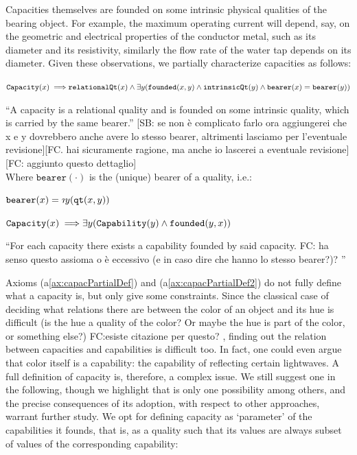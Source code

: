 \documentclass[sw]{iosart2x}
\newcommand{\bflist}{\begin{list}{}{\setlength{\topsep}{2mm}\setlength{\partopsep}{0mm}\setlength{\parsep}{0mm}\setlength{\leftmargin}{9mm}\setlength{\labelwidth}{8mm}}}
\newcommand{\eflist}{\end{list}}
\newcommand{\AxLabel}{\textrm{a}}
\newcommand{\DefLabel}{\textrm{d}}
\newcounter{cntax}
\newcommand{\myax}[1]{\refstepcounter{cntax}\begin{small}{\bf \AxLabel\thecntax\label{ax:#1}}\end{small}}
\newcounter{cntdef}
\newcommand{\mydf}[1]{\refstepcounter{cntdef}\begin{small}{\bf \DefLabel\thecntdef\label{def:#1}}\end{small}}
\newcommand{\mytext}[1]{``#1''}
\newcommand{\refax}[1]{({\AxLabel}\ref{#1})}
\newcommand{\generalStyle}[1]{\texttt{#1}}
\newcommand{\biRel}[3]{\generalStyle{#1}(#2,#3)}
\newcommand{\uniRel}[2]{\generalStyle{#1}(#2)}
\newcommand{\myfi}{\hspace{0.9mm} \Longrightarrow}
\newcommand{\suchthat}{\rotatebox[origin=c]{180}{$\iota$}}
\newcommand{\DOLCEQualityDirect}[2]{\biRel{qt}{#1}{#2}}
\newcommand{\bearer}[1]{\uniRel{bearer}{#1}}
\newcommand{\Capability}[1]{\uniRel{Capability}{#1}}
\newcommand{\Capacity}[1]{\uniRel{Capacity}{#1}}
\newcommand{\RelationalQuality}[1]{\uniRel{relationalQt}{#1}}
\newcommand{\IntrinsicQuality}[1]{\uniRel{intrinsicQt}{#1}}
\newcommand{\founded}[2]{\biRel{\foundedTerm{passive}}{#1}{#2}}
\newcommand{\foundedTerm}[1]{%
  \ifthenelse{\equal{#1}{passive}}{founded}{%
    \ifthenelse{\equal{#1}{verb}}{found}{%
      \ifthenelse{\equal{#1}{gerund}}{founding}{%
        ERROR!%
      }%
    }%
  }%
}
\newcommand{\quotes}[1]{`#1'}
\newcommand{\TODO}[1]{{\color{red} #1
}}
\newcommand{\TODOinline}[1]{{\color{red} #1
}}
\begin{document}
Capacities themselves are founded on some intrinsic physical qualities of the bearing object. For example, the maximum operating current will depend, say, on the geometric and electrical properties of the conductor metal, such as its diameter and its resistivity, similarly the flow rate of the water tap depends on its diameter. Given these observations, we partially characterize capacities as follows:   
\bflist
\item[\myax{capacPartialDef}] $ \Capacity{x} \myfi \RelationalQuality{x} \land \exists y(\founded{x}{y} \land \IntrinsicQuality{y} \land \bearer{x} = \bearer{y}) $%
\item[] \mytext{A capacity is a relational quality and is founded on some intrinsic quality, which is carried by the same bearer.}\TODOinline{[SB: se non è complicato farlo ora aggiungerei che x e y dovrebbero anche avere lo stesso bearer, altrimenti lasciamo per l'eventuale revisione][FC. hai sicuramente ragione, ma anche io lascerei a eventuale revisione][FC: aggiunto questo dettaglio]}
\\ Where $\bearer{\cdot}$ is the (unique) bearer of a quality, i.e.:
\item[\mydf{beareDef}] $ \bearer{x} = \suchthat y (\DOLCEQualityDirect{x}{y}) $ 
\item[\myax{capacPartialDef2}] $ \Capacity{x} \myfi \exists y( \Capability{y} \land \founded{y}{x}) $  %
\item[] \mytext{For each capacity there exists a capability founded by said capacity.\TODO{FC: ha senso questo assioma o è eccessivo (e in caso dire che hanno lo stesso bearer?)?}}
\eflist
Axioms \refax{ax:capacPartialDef} and \refax{ax:capacPartialDef2} do not fully define what a capacity is, but only give some constraints.
Since the classical case of deciding what relations there are between the color of an object and its hue is difficult (is the hue a quality of the color? Or maybe the hue is part of the color, or something else?)\TODO{FC:esiste citazione per questo?}, finding out the relation between capacities and capabilities is difficult too. In fact, one could even argue that color itself is a capability: the capability of reflecting certain lightwaves.
A full definition of capacity is, therefore, a complex issue.
We still suggest one in the following, though we highlight that is only one possibility among others, and the precise consequences of its adoption, with respect to other approaches, warrant further study.
We opt for defining capacity as \quotes{parameter} of the capabilities it founds, that is, as a quality such that its values are always subset of values of the corresponding capability:
\end{document}

